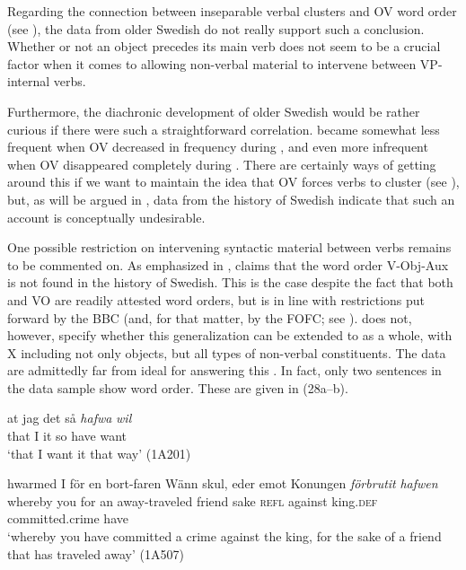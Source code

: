 \documentclass[output=paper, colorlinks, citecolor=brown]{langscibook}
\begin{document}
Regarding the connection between inseparable verbal clusters and OV word order (see \citealt[17–19, 33–35]{Haider2010}), the data from older Swedish do not really support such a conclusion. Whether or not an object precedes its main verb does not seem to be a crucial factor when it comes to allowing non-verbal material to intervene between VP-internal verbs.



Furthermore, the diachronic development of older Swedish would be rather curious if there were such a straightforward correlation.  became somewhat less frequent when OV decreased in frequency during , and even more infrequent when OV disappeared completely during . There are certainly ways of getting around this if we want to maintain the idea that OV forces verbs to cluster (see \cites[290–292]{Haider2010}[132–135]{Haider2013}), but, as will be argued in , data from the history of Swedish indicate that such an account is conceptually undesirable.



One possible restriction on intervening syntactic material between verbs remains to be commented on. As emphasized in , \citet[155, 159]{Petzell2011}  claims that the word order V-Obj-Aux is not found in the history of Swedish. This is the case despite the fact that both  and VO are readily attested word orders, but is in line with restrictions put forward by the BBC (and, for that matter, by the FOFC; see ). \citet{Petzell2011} does not, however, specify whether this generalization can be extended to  as a whole, with X including not only objects, but all types of non-verbal constituents. The  data are admittedly far from ideal for answering this . In fact, only two sentences in the data sample show  word order. These are given in (28a–b).


\ea\label{ex:sangfelt:28}
\ea\label{ex:sangfelt:28a}
\gll at jag det så \textit{hafwa} \textit{wil} \\ %
 that I it so have want\\
\glt ‘that I want it that way’ (1A201)

\ex\label{ex:sangfelt:28b}
\gll hwarmed I {för} {en} {bort-faren} {Wänn} {skul,} {eder} {emot} {Konungen} \textit{förbrutit} \textit{hafwen}\\
 whereby you for an away-traveled friend sake \textsc{refl} against king.\textsc{def} committed.crime have\\
\glt ‘whereby you have committed a crime against the king, for the sake of a friend that has traveled away’ (1A507)
\z 
\z 
\end{document}
